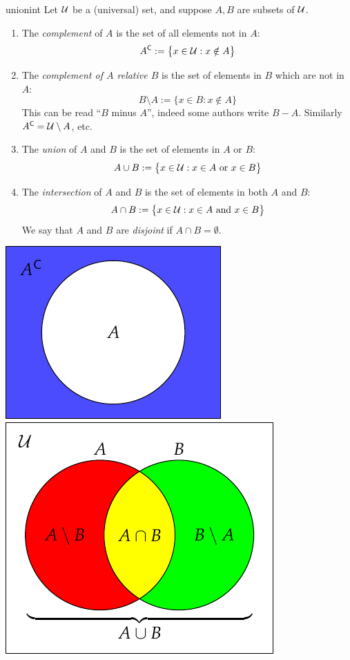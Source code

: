 \begin{defn}{}{unionint}
	Let $\mathcal{U}$ be a (universal) set,\footnotemark{} and suppose $A,B$ are subsets of $\mathcal{U}$.
	\begin{enumerate}\itemsep0pt
	  \item The \emph{complement} of $A$ is the set of all elements not in $A$:
		\[
			{A}^{\mathsf{C}}:=\bigl\{x\in\mathcal{U}:x\notin A\bigr\}
		\]
		\item The \emph{complement of $A$ relative $B$} is the set of elements in $B$ which are not in $A$:
		\[
			B\setminus A:=\bigl\{x\in B:x\notin A\bigr\}
		\]
		This can be read ``$B$ minus $A$'', indeed some authors write $B-A$. Similarly ${A}^{\mathsf{C}}=\mathcal{U}\setminus A$, etc.
		\item The \emph{union} of $A$ and $B$ is the set of elements in $A$ or $B$:
		\[
			A\cup B:=\bigl\{x\in\mathcal{U}:x\in A\text{ or }x\in B\bigr\}
		\]
		\item The \emph{intersection} of $A$ and $B$ is the set of elements in both $A$ and $B$:
		\[
			A\cap B:=\bigl\{x\in\mathcal{U}:x\in A\text{ and }x\in B\bigr\}
		\]
		We say that $A$ and $B$ are \emph{disjoint} if $A\cap B=\emptyset$.
	\end{enumerate}
	
	\begin{center}
		\includegraphics{sets-05-venncomp}
		\qquad\qquad
		\includegraphics{sets-04-vennunion}
	\end{center}
\end{defn}

